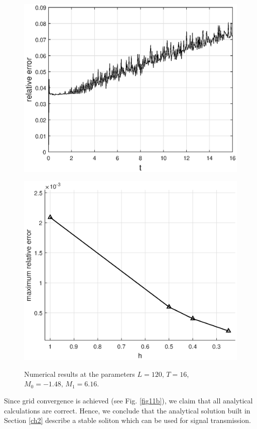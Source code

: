 \documentclass[preprint,12pt]{elsarticle}
\begin{document}
\begin{figure}[H]
\begin{center}
\begin{minipage}[h]{0.48\linewidth} %
\includegraphics[width=1\linewidth]{fig13.eps}
\label{fig11a}
\end{minipage}
\hfill
\begin{minipage}[h]{0.48\linewidth}
\includegraphics[width=1\linewidth]{fig45.eps}
\label{fig11b}
\end{minipage}
\end{center}
\caption{Numerical results at the parameters
\(L=120,\, T=16\), 
\(M_{0}=-1.48,\, M_{1}=6.16\).}
\label{fig11}
\end{figure}
Since grid convergence is achieved (see Fig. \ref{fig11b}), we claim that all analytical calculations are correct. Hence, we conclude that the analytical solution built in Section \ref{ch2} describe a stable soliton which can be used for signal transmission.
\end{document}
